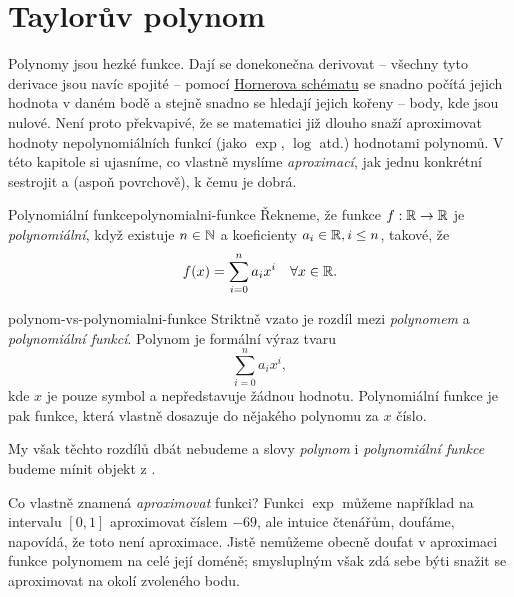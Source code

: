 \chapter{Taylorův polynom}
\label{chap:tayloruv-polynom}


Polynomy jsou hezké funkce. Dají se donekonečna derivovat -- všechny tyto
derivace jsou navíc spojité -- pomocí
\href{https://en.wikipedia.org/wiki/Horner%27s_method}{Hornerova schématu} se
 snadno počítá jejich hodnota v daném bodě a stejně snadno se hledají jejich
 kořeny -- body, kde jsou nulové. Není proto překvapivé, že se matematici již
 dlouho snaží aproximovat hodnoty nepolynomiálních funkcí (jako $\exp$, $\log$
 atd.) hodnotami polynomů. V této kapitole si ujasníme, co vlastně myslíme
 \emph{aproximací}, jak jednu konkrétní sestrojit a (aspoň povrchově), k čemu je
 dobrá.

\begin{definition}{Polynomiální funkce}{polynomialni-funkce}
 Řekneme, že funkce $f:\mathbb{R} \to \mathbb{R}$ je \emph{polynomiální}, když existuje $n \in
 \mathbb{N}$ a koeficienty $a_i \in \mathbb{R}, i \leq n$, takové, že
 \[
  f(x) = \sum_{i=0}^{n} a_i x^{i} \quad \forall x \in \mathbb{R}.
 \]
\end{definition}

\begin{remark}{}{polynom-vs-polynomialni-funkce}
 Striktně vzato je rozdíl mezi \emph{polynomem} a \emph{polynomiální funkcí}.
 Polynom je formální výraz tvaru
 \[
  \sum_{i=0}^{n} a_i x^{i},
 \]
 kde $x$ je pouze symbol a nepředstavuje žádnou hodnotu. Polynomiální funkce je
 pak funkce, která vlastně dosazuje do nějakého polynomu za $x$ číslo.

 My však těchto rozdílů dbát nebudeme a slovy \emph{polynom} i
 \emph{polynomiální funkce} budeme mínit objekt z
 .
\end{remark}

Co vlastně znamená \emph{aproximovat} funkci? Funkci $\exp$ můžeme například na
intervalu $[0,1]$ aproximovat číslem $-69$, ale intuice čtenářům, doufáme,
napovídá, že toto není  aproximace. Jistě nemůžeme obecně doufat v
aproximaci funkce polynomem na celé její doméně; smysluplným však zdá sebe býti
snažit se aproximovat na okolí zvoleného bodu.
